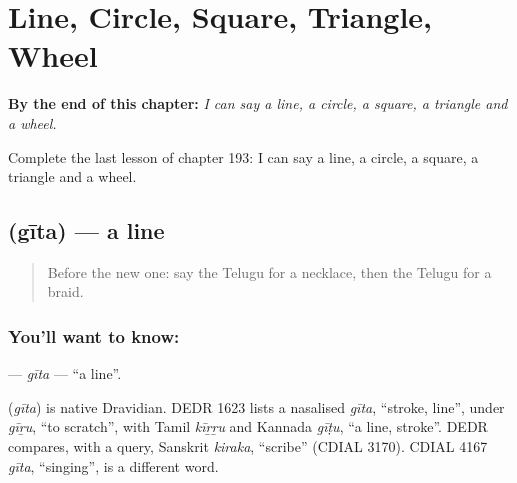 
\chapter{Line, Circle, Square, Triangle, Wheel}
\label{ch:te-line-circle-square-triangle-wheel}

\begin{chapteropening}
\textbf{By the end of this chapter:} \emph{I can say a line, a circle, a square, a triangle and a wheel.}

Complete the last lesson of chapter 193: I can say a line, a circle, a square, a triangle and a wheel.
\end{chapteropening}

\section[\texorpdfstring{\te{గీత} (gīta)}{గీత (gīta)}]{ (gīta) — a line}

\label{lesson:TE-C193-gita}



\begin{quote}
Before the new one: say the Telugu for a necklace, then the Telugu for a braid.
\end{quote}

\subsection*{You'll want to know: }
\textbf{} — \emph{gīta} — \textquotedblleft{}a line\textquotedblright{}.

\begin{cousinweb}
\textbf{} (\emph{gīta}) is native Dravidian. DEDR 1623 lists a nasalised \emph{gīta}, \textquotedblleft{}stroke, line\textquotedblright{}, under \emph{gīṟu}, \textquotedblleft{}to scratch\textquotedblright{}, with Tamil \emph{kīṟṟu} and Kannada \emph{gīṭu}, \textquotedblleft{}a line, stroke\textquotedblright{}. DEDR compares, with a query, Sanskrit \emph{kiraka}, \textquotedblleft{}scribe\textquotedblright{} (CDIAL 3170). CDIAL 4167 \emph{gīta}, \textquotedblleft{}singing\textquotedblright{}, is a different word.
\end{cousinweb}

